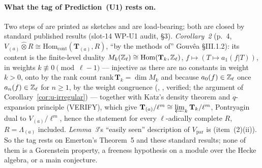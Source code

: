 \documentclass[11pt]{article}
\newcommand{\VERIFYloc}{\textsf{VERIFY}}          %
\newcommand{\Iw}{\Lambda}                         %
\newcommand{\Zl}{\Z_\ell}
\begin{document}
\paragraph{What the tag of Prediction~(U1) rests on.} Two steps of \cite{emerton_eis} are printed as sketches and are load-bearing; both are
closed by standard published results (slot-14 WP-U1 audit, \S3). \emph{Corollary~2} (p.~4, $V_{(a)}\hat\otimes R\cong\mathrm{Hom}_{\mathrm{cont}}(\mathbf T_{(a)},R)$,
``by the methods of'' Gouv\^ea \S III.1.2): its content is the finite-level duality $M_k(\Zl)\cong\mathrm{Hom}(\mathbf T_k,\Zl)$, $f\mapsto(T\mapsto a_1(f|T))$, in
weights $k\not\equiv0\pmod{\ell-1}$ --- injective as there are no constants in weight $k>0$, onto by the rank count $\mathrm{rank}\,\mathbf T_k=\dim M_k$ and
because $a_0(f)\in\Zl$ once $a_n(f)\in\Zl$ for $n\ge1$, by the weight congruence (\cite[Thm.~2(iv)]{swinnerton_dyer}, \cite[Th.~2]{serre_bourbaki416}, verified; the argument of
Corollary~\ref{cor:u-irregular}) --- together with Katz's density theorem and $q$-expansion principle (\VERIFYloc), which give
$\mathbf T_{(a)}/\ell^{m}\cong\varprojlim_k\mathbf T_k/\ell^{m}$, Pontryagin dual to $V_{(a)}/\ell^{m}$, hence the statement for every $\ell$-adically complete $R$,
$R=\Iw_{(a)}$ included. \emph{Lemma~3}'s ``easily seen'' description of $V_{\mathrm{par}}$ is \cite[Thm.~2.2]{hida_aif2} (item~(2)(ii)). So the tag rests on
Emerton's Theorem~5 and these standard results; none of them is a Gorenstein property, a freeness hypothesis on a module over the Hecke algebra, or a main
conjecture.
\end{document}
